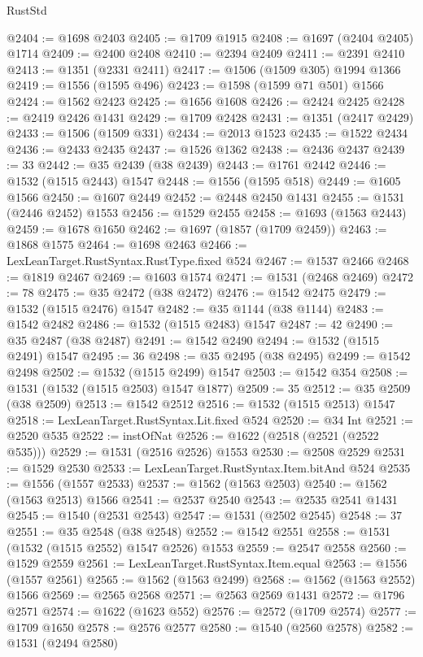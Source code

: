\begin{lexlean}{RustStd}
\begin{coremodule}
@2404 := @1698 @2403
@2405 := @1709 @1915
@2408 := @1697 (@2404 @2405) @1714
@2409 := @2400 @2408
@2410 := @2394 @2409
@2411 := @2391 @2410
@2413 := @1351 (@2331 @2411)
@2417 := @1506 (@1509 @305) @1994 @1366
@2419 := @1556 (@1595 @496)
@2423 := @1598 (@1599 @71 @501) @1566
@2424 := @1562 @2423
@2425 := @1656 @1608
@2426 := @2424 @2425
@2428 := @2419 @2426 @1431
@2429 := @1709 @2428
@2431 := @1351 (@2417 @2429)
@2433 := @1506 (@1509 @331)
@2434 := @2013 @1523
@2435 := @1522 @2434
@2436 := @2433 @2435
@2437 := @1526 @1362
@2438 := @2436 @2437
@2439 := 33
@2442 := @35 @2439 (@38 @2439)
@2443 := @1761 @2442
@2446 := @1532 (@1515 @2443) @1547
@2448 := @1556 (@1595 @518)
@2449 := @1605 @1566
@2450 := @1607 @2449
@2452 := @2448 @2450 @1431
@2455 := @1531 (@2446 @2452) @1553
@2456 := @1529 @2455
@2458 := @1693 (@1563 @2443)
@2459 := @1678 @1650
@2462 := @1697 (@1857 (@1709 @2459))
@2463 := @1868 @1575
@2464 := @1698 @2463
@2466 := LexLeanTarget.RustSyntax.RustType.fixed @524
@2467 := @1537 @2466
@2468 := @1819 @2467
@2469 := @1603 @1574
@2471 := @1531 (@2468 @2469)
@2472 := 78
@2475 := @35 @2472 (@38 @2472)
@2476 := @1542 @2475
@2479 := @1532 (@1515 @2476) @1547
@2482 := @35 @1144 (@38 @1144)
@2483 := @1542 @2482
@2486 := @1532 (@1515 @2483) @1547
@2487 := 42
@2490 := @35 @2487 (@38 @2487)
@2491 := @1542 @2490
@2494 := @1532 (@1515 @2491) @1547
@2495 := 36
@2498 := @35 @2495 (@38 @2495)
@2499 := @1542 @2498
@2502 := @1532 (@1515 @2499) @1547
@2503 := @1542 @354
@2508 := @1531 (@1532 (@1515 @2503) @1547 @1877)
@2509 := 35
@2512 := @35 @2509 (@38 @2509)
@2513 := @1542 @2512
@2516 := @1532 (@1515 @2513) @1547
@2518 := LexLeanTarget.RustSyntax.Lit.fixed @524
@2520 := @34 Int
@2521 := @2520 @535
@2522 := instOfNat
@2526 := @1622 (@2518 (@2521 (@2522 @535)))
@2529 := @1531 (@2516 @2526) @1553
@2530 := @2508 @2529
@2531 := @1529 @2530
@2533 := LexLeanTarget.RustSyntax.Item.bitAnd @524
@2535 := @1556 (@1557 @2533)
@2537 := @1562 (@1563 @2503)
@2540 := @1562 (@1563 @2513) @1566
@2541 := @2537 @2540
@2543 := @2535 @2541 @1431
@2545 := @1540 (@2531 @2543)
@2547 := @1531 (@2502 @2545)
@2548 := 37
@2551 := @35 @2548 (@38 @2548)
@2552 := @1542 @2551
@2558 := @1531 (@1532 (@1515 @2552) @1547 @2526) @1553
@2559 := @2547 @2558
@2560 := @1529 @2559
@2561 := LexLeanTarget.RustSyntax.Item.equal
@2563 := @1556 (@1557 @2561)
@2565 := @1562 (@1563 @2499)
@2568 := @1562 (@1563 @2552) @1566
@2569 := @2565 @2568
@2571 := @2563 @2569 @1431
@2572 := @1796 @2571
@2574 := @1622 (@1623 @552)
@2576 := @2572 (@1709 @2574)
@2577 := @1709 @1650
@2578 := @2576 @2577
@2580 := @1540 (@2560 @2578)
@2582 := @1531 (@2494 @2580)

\end{coremodule}
\end{lexlean}
